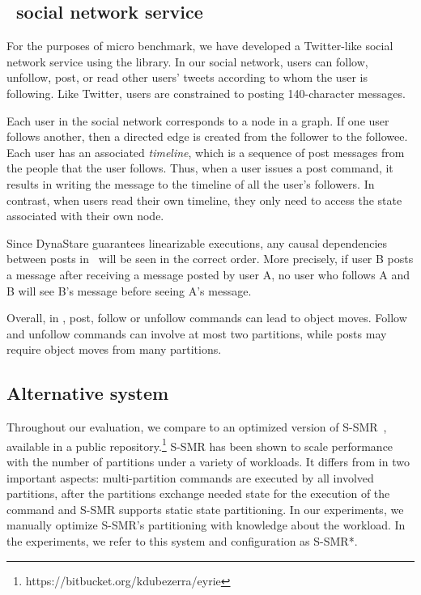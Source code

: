 \subsection{\appname\ social network service}
\label{sec:imp:\appname}

For the purposes of micro benchmark, we have developed a Twitter-like
social network service using the \dynastar{} library.  In our social
network, users can follow, unfollow, post, or read other users' tweets
according to whom the user is following. Like Twitter, users are
constrained to posting 140-character messages.

Each user in the social network corresponds to a node in a graph. If
one user follows another, then a directed edge is created from the
follower to the followee. Each user has an associated \emph{timeline},
which is a sequence of post messages from the people that the user
follows. Thus, when a user issues a post command, it results in
writing the message to the timeline of all the user's followers.  In
contrast, when users read their own timeline, they only need
to access the state associated with their own node.

Since DynaStare guarantees linearizable executions, any causal dependencies between posts in \appname\ will be seen in the correct order. 
More precisely, if user B posts a message after receiving a message posted by user A, no user who follows A and B will see B's message before seeing A's message.

Overall, in \appname, post, follow or unfollow commands can lead to
object moves.  Follow and unfollow commands can involve at most two
partitions, while posts may require object moves from many partitions.



\subsection{Alternative system}

Throughout our evaluation, we compare \dynastar{} to an optimized version of S-SMR~\cite{bezerra2014ssmr}, available in a public repository.\footnote{https://bitbucket.org/kdubezerra/eyrie}
S-SMR has been shown to scale performance with the number of partitions under a variety of workloads.
It differs from \dynastar{} in two important aspects:
multi-partition commands are executed by all involved partitions, after the partitions exchange needed state for the execution of the command and S-SMR supports static state partitioning.
In our experiments, we manually optimize S-SMR's partitioning with knowledge about the workload.
In the experiments, we refer to this system and configuration as S-SMR*.

